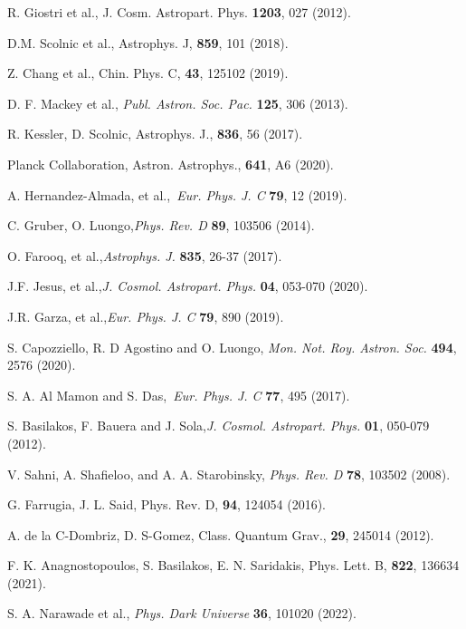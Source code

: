 \documentclass[prd,superscriptaddress,amsfonts,amssymb,amsmath,showpacs,twocolumn]{revtex4-2}
\begin{document}
\begin{thebibliography}{99}
 R. Giostri et al., J. Cosm. Astropart. Phys. \textbf{%
1203}, 027 (2012).

 D.M. Scolnic et al., Astrophys. J, \textbf{859}, 101
(2018).

 Z. Chang et al., Chin. Phys. C, \textbf{43}, 125102
(2019).

 D. F. Mackey et al., \textit{Publ. Astron. Soc. Pac.} 
\textbf{125}, 306 (2013).

 R. Kessler, D. Scolnic, Astrophys. J., \textbf{836},
56 (2017).

 Planck Collaboration, Astron. Astrophys., \textbf{641},
A6 (2020).


 A. Hernandez-Almada, et al.,\textit{\ Eur. Phys. J. C} 
\textbf{79}, 12 (2019).

 C. Gruber, O. Luongo,\textit{Phys. Rev. D} \textbf{89},
103506 (2014).

 O. Farooq, et al.,\textit{Astrophys. J.} \textbf{835},
26-37 (2017).

 J.F. Jesus, et al.,\textit{J. Cosmol. Astropart. Phys.} 
\textbf{04}, 053-070 (2020).

 J.R. Garza, et al.,\textit{Eur. Phys. J. C} \textbf{79}, 890
(2019).

 S. Capozziello, R. D Agostino and O. Luongo,\textit{%
Mon. Not. Roy. Astron. Soc.} \textbf{494}, 2576 (2020).

 S. A. Al Mamon and S. Das,\textit{\ Eur. Phys. J. C} \textbf{%
77}, 495 (2017).

 S. Basilakos, F. Bauera and J. Sola,\textit{J. Cosmol.
Astropart. Phys.} \textbf{01}, 050-079 (2012).

 V. Sahni, A. Shafieloo, and A. A. Starobinsky, \textit{Phys.
Rev. D} \textbf{78}, 103502 (2008).

 G. Farrugia, J. L. Said, Phys. Rev. D, \textbf{94},
124054 (2016).

 A. de la C-Dombriz, D. S-Gomez, Class. Quantum Grav., 
\textbf{29}, 245014 (2012).

 F. K. Anagnostopoulos, S. Basilakos, E. N.
Saridakis, Phys. Lett. B, \textbf{822}, 136634 (2021).

 S. A. Narawade et al., \textit{Phys. Dark Universe} \textbf{36}, 101020 (2022).

\end{thebibliography}
\end{document}
